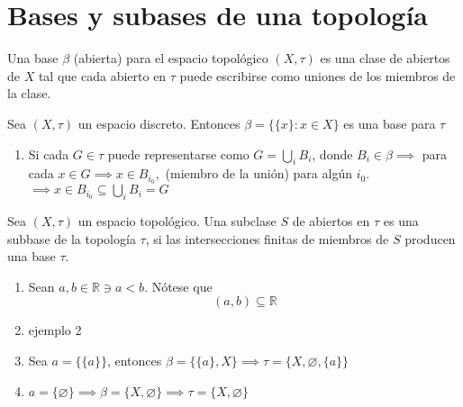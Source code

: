  
\section{Bases y subases de una topología}

\begin{definicion}
    Una base $\beta$ (abierta) para el espacio topológico $(X,\tau)$ es una clase de abiertos de $X$ tal que cada abierto en $\tau$ puede escribirse como uniones de los miembros de la clase. 
\end{definicion}

\begin{ejemplo}
    Sea $(X,\tau)$ un espacio discreto. Entonces $\beta = \{\{x\}:x\in X\}$ es una base para $\tau$
\end{ejemplo}

\begin{cajita}
    \begin{nota}
        \begin{enumerate}
            \item Si cada $G\in \tau$ puede representarse como $G=\bigcup_iB_i$, donde $B_i\in \beta\implies$ para cada $x\in G\implies x\in B_{i_0},$ (miembro de la unión) para algún $i_0$. $\implies x\in B_{i_0}\subseteq \bigcup_i B_i=G$
        \end{enumerate}
    \end{nota}
\end{cajita}

\begin{definicion}
    Sea $(X,\tau)$ un espacio topológico. Una subclase $S$ de abiertos en $\tau$ es una subbase de la topología $\tau$, si las intersecciones finitas de miembros de $S$ producen una base $\tau$. 
\end{definicion}

\begin{ejemplo}
    \begin{enumerate}
        \item Sean $a,b\in\mathbb{R}\ni a<b$. Nótese que 
        $$(a,b)\subseteq \mathbb{R}$$
        \item ejemplo 2
        \item Sea $a=\{\{a\}\}$, entonces $\beta=\{\{a\},X\}\implies \tau=\{X,\varnothing,\{a\}\}$
        \item $a=\{\varnothing\}\implies \beta=\{X,\varnothing\}\implies \tau=\{X,\varnothing\}$
    \end{enumerate}
    
\end{ejemplo}


